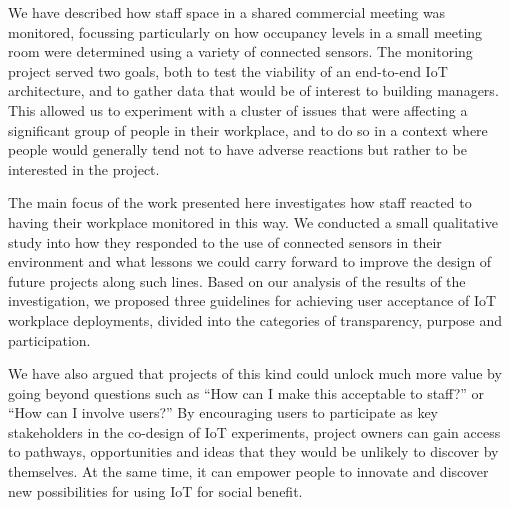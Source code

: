 We have described how staff space in a shared commercial meeting was
monitored, focussing particularly on how occupancy levels in a small
meeting room were determined using a variety of connected sensors. The
monitoring project served two goals, both to test the viability of an
end-to-end IoT architecture, and to gather data that would be of
interest to building managers. This allowed us to experiment with a
cluster of issues that were affecting a significant group of people in
their workplace, and to do so in a context where people would generally
tend not to have adverse reactions but rather to be interested in the
project.

The main focus of the work presented here investigates how staff
reacted to having their workplace monitored in this way.  We
conducted a small qualitative study into how they
responded to the use of connected sensors in their environment and what lessons we could
carry forward to improve the design of
future projects along such lines. Based on our analysis of the results
of the investigation, we proposed three
guidelines for achieving user acceptance of IoT workplace deployments,
divided into the categories of transparency, purpose and participation.

We have also argued that projects of this kind could unlock much more
value by going beyond questions such as ``How can I make this
acceptable to staff?” or ``How can I involve users?” By encouraging
users to participate as key stakeholders in the co-design of IoT
experiments, project owners can gain access to pathways, opportunities and ideas that they
would be unlikely to discover by themselves. At the same
time, it can empower people to innovate and discover new possibilities
for using IoT for social benefit.

